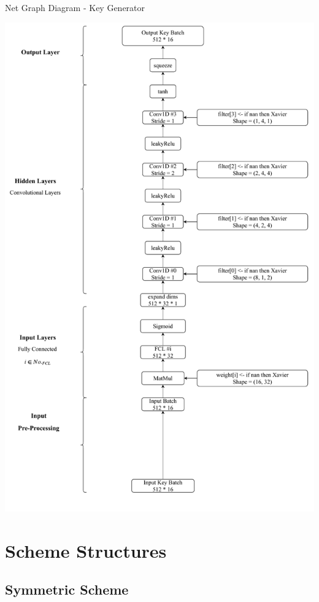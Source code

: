 \documentclass[a4paper, 12pt]{report}
\begin{document}
\begin{blockfigure}{ Net Graph Diagram - Key Generator}
	\begin{center}
		\includegraphics[width = \textwidth]{Generator-Diagram}
	\end{center}
\end{blockfigure}
\newpage
\section{\textbf{Scheme Structures}}
\subsection{\textbf{Symmetric Scheme}}
\end{document}
